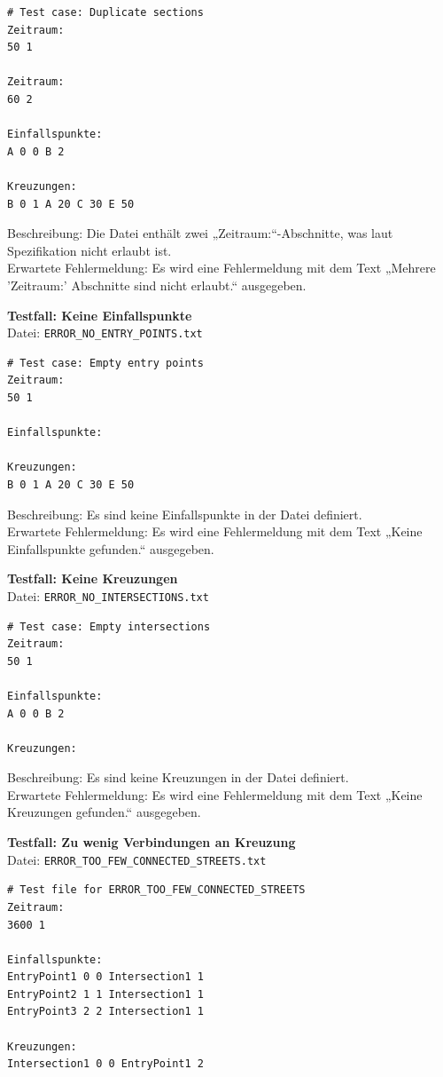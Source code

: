 \begin{lstlisting}
# Test case: Duplicate sections
Zeitraum:
50 1

Zeitraum:
60 2

Einfallspunkte:
A 0 0 B 2

Kreuzungen:
B 0 1 A 20 C 30 E 50
\end{lstlisting}

Beschreibung: Die Datei enthält zwei „Zeitraum:“-Abschnitte, was laut Spezifikation nicht erlaubt ist. \\
Erwartete Fehlermeldung: Es wird eine Fehlermeldung mit dem Text „Mehrere 'Zeitraum:' Abschnitte sind nicht erlaubt.“ ausgegeben.

\textbf{Testfall: Keine Einfallspunkte} \\
Datei: \texttt{ERROR\_NO\_ENTRY\_POINTS.txt}

\begin{lstlisting}
# Test case: Empty entry points
Zeitraum:
50 1

Einfallspunkte:

Kreuzungen:
B 0 1 A 20 C 30 E 50
\end{lstlisting}

Beschreibung: Es sind keine Einfallspunkte in der Datei definiert. \\
Erwartete Fehlermeldung: Es wird eine Fehlermeldung mit dem Text „Keine Einfallspunkte gefunden.“ ausgegeben.

\clearpage

\textbf{Testfall: Keine Kreuzungen} \\
Datei: \texttt{ERROR\_NO\_INTERSECTIONS.txt}

\begin{lstlisting}
# Test case: Empty intersections
Zeitraum:
50 1

Einfallspunkte:
A 0 0 B 2

Kreuzungen:
\end{lstlisting}

Beschreibung: Es sind keine Kreuzungen in der Datei definiert. \\
Erwartete Fehlermeldung: Es wird eine Fehlermeldung mit dem Text „Keine Kreuzungen gefunden.“ ausgegeben.

\textbf{Testfall: Zu wenig Verbindungen an Kreuzung} \\
Datei: \texttt{ERROR\_TOO\_FEW\_CONNECTED\_STREETS.txt}

\begin{lstlisting}
# Test file for ERROR_TOO_FEW_CONNECTED_STREETS
Zeitraum:
3600 1

Einfallspunkte:
EntryPoint1 0 0 Intersection1 1
EntryPoint2 1 1 Intersection1 1
EntryPoint3 2 2 Intersection1 1

Kreuzungen:
Intersection1 0 0 EntryPoint1 2
\end{lstlisting}

